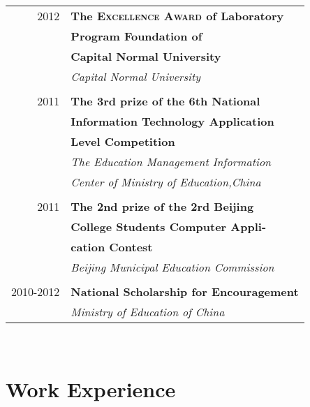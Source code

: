 \documentclass[10pt]{article} %
\begin{document}
\begin{minipage}[t]{0.44\textwidth}
\begin{tabular}{rl}
2012	 & \small\textbf{The \textsc{Excellence Award} of Laboratory }\\
& \small\textbf{ Program Foundation of  }\\
& \small\textbf{ Capital Normal University}\\
& \small\textit{Capital Normal University}\\ \\

2011	 & \small\textbf{The 3rd prize of the 6th National} \\
& \small\textbf{ Information Technology Application }\\
& \small\textbf{ Level Competition}\\
& \small\textit{The Education Management Information}\\
& \small\textit{ Center of Ministry of Education,China}\\ \\

2011	 & \small\textbf{The 2nd prize of the 2rd Beijing}\\
& \small\textbf{ College Students Computer Appli-}\\
& \small\textbf{ cation Contest}\\
& \small\textit{Beijing Municipal Education Commission}\\ \\

2010-2012	 & \small\textbf{National Scholarship for Encouragement}\\
& \small\textit{Ministry of Education of China}

\end{tabular}\\[0pt]


\section{Work Experience} 


\end{minipage}
\end{document}
